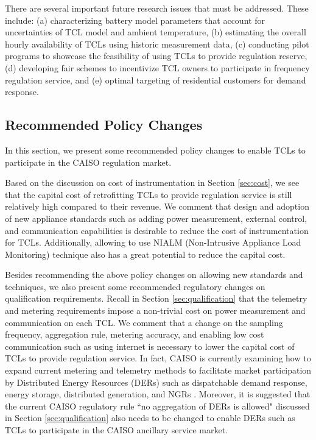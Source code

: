 \documentclass[onecolumn,journal]{IEEEtran}
\begin{document}
There are several important future research issues that must be addressed. These include: (a) characterizing battery model parameters that account for uncertainties of TCL model and ambient temperature, (b) estimating the overall hourly availability of TCLs using historic measurement data, (c) conducting pilot programs to showcase the feasibility of using TCLs to provide regulation reserve, (d) developing fair schemes to incentivize \ac{TCL} owners to participate in frequency regulation service, and (e) optimal targeting of residential customers for 
demand response. 

\subsection{Recommended Policy Changes}
In this section, we present some recommended policy changes to enable \acp{TCL} to participate in the \ac{CAISO} regulation market. 

Based on the discussion on cost of instrumentation in Section \ref{sec:cost}, we see that the capital cost of retrofitting TCLs to provide regulation service is still relatively high compared to their revenue. We comment that design and adoption of new appliance standards such as adding power measurement, external control, and communication capabilities is desirable to reduce the cost of instrumentation for TCLs. Additionally, allowing to use NIALM (Non-Intrusive Appliance Load Monitoring) technique also has a great potential to reduce the capital cost.  

Besides recommending the above policy changes on allowing new standards and techniques, we also present some recommended regulatory changes on qualification requirements. Recall in Section \ref{sec:qualification} that the telemetry and metering requirements impose a non-trivial cost on power measurement and communication on each \ac{TCL}. We comment that a change on the sampling frequency, aggregation rule, metering accuracy, and enabling low cost communication such as using internet is necessary to lower the capital cost of \acp{TCL} to provide regulation service. In fact, CAISO is currently examining how to expand current metering and telemetry methods  to facilitate market participation by Distributed Energy Resources (DERs) such as dispatchable demand response, energy storage, distributed generation, and NGRs \cite{CAISO_telemetry_change}. Moreover, it is suggested that the current CAISO regulatory rule ``no aggregation of DERs is allowed" discussed in Section \ref{sec:qualification}  also needs to be changed to enable DERs such as TCLs to participate in the CAISO ancillary service market. 
\end{document}
